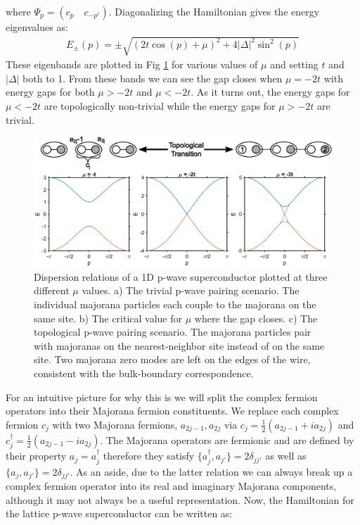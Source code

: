 where $\Psi_{p}=(c_{p}\quad c_{-p^{\dagger}})$. Diagonalizing the Hamiltonian gives the energy eigenvalues as:
\begin{align}
	E_{\pm}(p) = \pm\sqrt{(2t\cos(p)+\mu)^{2}+4|\Delta|^{2}\sin^{2}(p)}
\end{align}
These eigenbands are plotted in Fig \ref{pwavesc} for various values of $\mu$ and setting $t$ and $|\Delta|$ both to 1. From these bands we can see the gap closes when $\mu=-2t$ with energy gaps for both $\mu>-2t$ and $\mu<-2t$. As it turns out, the energy gaps for $\mu < -2t$ are topologically non-trivial while the energy gaps for $\mu > -2t$ are trivial.
\begin{figure}
	\centering
	\includegraphics[width=\textwidth]{Intro/Figures/PWave_SC.eps}
	\caption{Dispersion relations of a 1D p-wave superconductor plotted at three different $\mu$ values. a) The trivial p-wave pairing scenario. The individual majorana particles each couple to the majorana on the same site. b) The critical value for $\mu$ where the gap closes. c) The topological p-wave pairing scenario. The majorana particles pair with majoranas on the nearest-neighbor site instead of on the same site. Two majorana zero modes are left on the edges of the wire, consistent with the bulk-boundary correspondence.}
	\label{pwavesc}
\end{figure}
For an intuitive picture for why this is we will split the complex fermion operators into their Majorana fermion constituents. We replace each complex fermion $c_{j}$ with two Majorana fermions, $a_{2j-1},a_{2j}$ via $c_{j}=\frac{1}{2}(a_{2j-1}+ia_{2j})$ and $c_{j}^{\dagger}=\frac{1}{2}(a_{2j-1}-ia_{2j})$. The Majorana operators are fermionic and are defined by their property $a_{j}=a_{j}^{\dagger}$ therefore they satisfy $\{a_{j}^{\dagger},a_{j'}\}=2\delta_{jj'}$ as well as $\{a_{j},a_{j'}\}=2\delta_{jj'}$. As an aside, due to the latter relation we can always break up a complex fermion operator into its real and imaginary Majorana components, although it may not always be a useful representation. Now, the Hamiltonian for the lattice p-wave superconductor can be written as:
